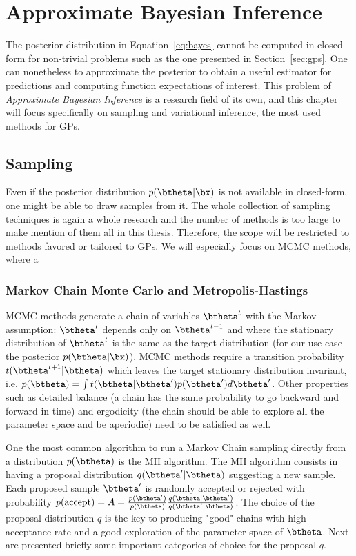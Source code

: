 \section{Approximate Bayesian Inference}
\label{sec:approx_inf}
The posterior distribution in Equation~\eqref{eq:bayes} cannot be computed in closed-form for non-trivial problems such as the one presented in Section~\ref{sec:gps}.
One can nonetheless to approximate the posterior to obtain a useful estimator for predictions and computing function expectations of interest.
This problem of \textit{Approximate Bayesian Inference} is a research field of its own, and this chapter will focus specifically on sampling and variational inference, the most used methods for \ac{GPs}.

\subsection{Sampling}

Even if the posterior distribution $p(\btheta|\bx)$ is not available in closed-form, one might be able to draw samples from it.
The whole collection of sampling techniques is again a whole research and the number of methods is too large to make mention of them all in this thesis.
Therefore, the scope will be restricted to methods favored or tailored to \ac{GPs}.
We will especially focus on \ac{MCMC} methods, where a
\subsubsection{Markov Chain Monte Carlo and Metropolis-Hastings}

\acf{MCMC} methods generate a chain of variables $\btheta^t$ with the Markov assumption: $\btheta^t$ depends only on $\btheta^{t-1}$ and where the stationary distribution of $\btheta^t$ is the same as the target distribution (for our use case the posterior $p(\btheta|\bx)$).
\ac{MCMC} methods require a transition probability $t(\btheta^{t+1}|\btheta)$ which leaves the target stationary distribution invariant, i.e. $p(\btheta) = \int t(\btheta|\btheta')p(\btheta')d\btheta'$.
Other properties such as detailed balance (a chain has the same probability to go backward and forward in time) and ergodicity (the chain should be able to explore all the parameter space and be aperiodic) need to be satisfied as well.

One the most common algorithm to run a Markov Chain sampling directly from a distribution $p(\btheta)$ is the \acf{MH} algorithm.
The \ac{MH} algorithm consists in having a proposal distribution $q(\btheta'|\btheta)$ suggesting a new sample.
Each proposed sample $\btheta'$ is randomly accepted or rejected with probability $p(\text{accept}) = A = \frac{p(\btheta')}{p(\btheta)}\frac{q(\btheta|\btheta')}{q(\btheta'|\btheta)}$.
The choice of the proposal distribution $q$ is the key to producing "good" chains with high acceptance rate and a good exploration of the parameter space of $\btheta$.
Next are presented briefly some important categories of choice for the proposal $q$.


